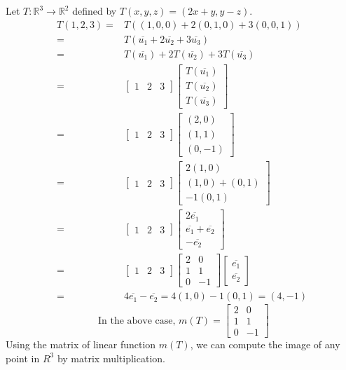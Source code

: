 \begin{commentary}
\begin{remark}[Example]
	Let $T : \mathbb{R}^3 \to \mathbb{R}^2$ defined by $T(x,y,z)=(2x+y,y-z)$.
	\begin{align*}
		T(1,2,3) = & T((1,0,0) + 2(0,1,0) + 3(0,0,1)) \\
		= & T(\overline{u_1}+2\overline{u_2}+3\overline{u_3}) \\
		= & T(\overline{u_1}) + 2T(\overline{u_2}) + 3T(\overline{u_3}) \\
		= & \begin{bmatrix} 1 & 2 & 3 \end{bmatrix} \begin{bmatrix} T(\overline{u_1}) \\ T(\overline{u_2}) \\ T(\overline{u_3}) \end{bmatrix} \\
		= & \begin{bmatrix} 1 & 2 & 3 \end{bmatrix} \begin{bmatrix} (2,0) \\ (1,1) \\ (0,-1) \end{bmatrix} \\
			= & \begin{bmatrix} 1 & 2 & 3 \end{bmatrix} \begin{bmatrix} 2(1,0) \\ (1,0)+(0,1) \\ -1(0,1) \end{bmatrix} \\
		= & \begin{bmatrix} 1 & 2 & 3 \end{bmatrix} \begin{bmatrix} 2\overline{e_1} \\ \overline{e_1}+\overline{e_2} \\ -\overline{e_2} \end{bmatrix} \\
		= & \begin{bmatrix} 1 & 2 & 3 \end{bmatrix} \begin{bmatrix} 2 & 0 \\ 1 & 1 \\ 0 & -1 \end{bmatrix} \begin{bmatrix} \overline{e_1} \\ \overline{e_2} \end{bmatrix} \\
		= & 4\overline{e_1}-\overline{e_2} = 4(1,0) - 1(0,1) = (4,-1)
	\end{align*}
	\[ \text{ In the above case, }m(T) = \begin{bmatrix} 2 & 0 \\ 1 & 1\\ 0 & -1 \end{bmatrix}\]
	Using the matrix of linear function $m(T)$, we can compute the image of any point in $R^3$ by matrix multiplication.
\end{remark}
\end{commentary}

